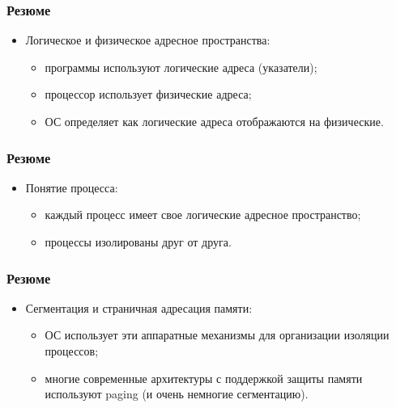 \begin{frame}
\frametitle{Резюме}
\begin{itemize}
    \item<1->Логическое и физическое адресное пространства:
    \begin{itemize}
        \item<2->программы используют логические адреса (указатели);
        \item<3->процессор использует физические адреса;
        \item<4->ОС определяет как логические адреса отображаются на физические.
    \end{itemize}
\end{itemize}
\end{frame}

\begin{frame}
\frametitle{Резюме}
\begin{itemize}
    \item<1->Понятие процесса:
    \begin{itemize}
        \item<2->каждый процесс имеет свое логические адресное пространство;
        \item<3->процессы изолированы друг от друга.
    \end{itemize}
\end{itemize}
\end{frame}

\begin{frame}
\frametitle{Резюме}
\begin{itemize}
    \item<1->Сегментация и страничная адресация памяти:
    \begin{itemize}
        \item<2->ОС использует эти аппаратные механизмы для организации изоляции
        процессов;
        \item<3->многие современные архитектуры с поддержкой защиты памяти
        используют paging (и очень немногие сегментацию).
    \end{itemize}
\end{itemize}
\end{frame}
